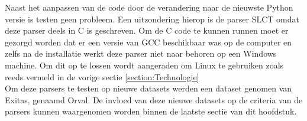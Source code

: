 Naast het aanpassen van de code door de verandering naar de nieuwste Python versie is testen geen probleem. Een uitzondering hierop is de parser SLCT omdat deze parser deels in C is geschreven. Om de C code te kunnen runnen moet er gezorgd worden dat er een versie van GCC beschikbaar was op de computer en zelfs na de installatie werkt deze parser niet naar behoren op een Windows machine. Om dit op te lossen wordt aangeraden om Linux te gebruiken zoals reeds vermeld in de vorige sectie \ref{section:Technologie}\\

Om deze parsers te testen op nieuwe datasets werden een dataset genomen van Exitas, genaamd Orval. De invloed van deze nieuwe datasets op de criteria van de parsers kunnen waargenomen worden binnen de laatste sectie van dit hoofdstuk.


